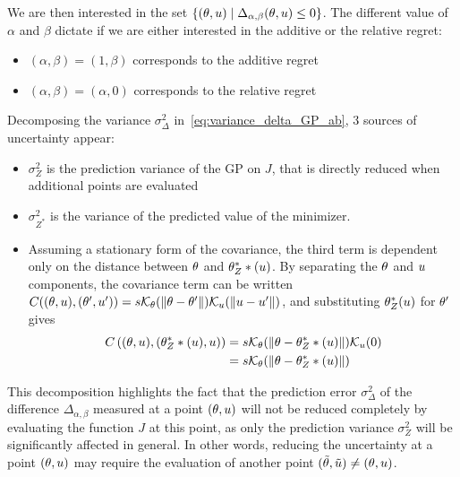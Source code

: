\documentclass[../../Main_ManuscritThese.tex]{subfiles}
\begin{document}
We are then interested in the set $\{(\theta, u) \mid \Delta_{\alpha, \beta}(\theta, u) \leq 0\}$. The different value of $\alpha$ and $\beta$ dictate if we are either interested in the additive or the relative regret:
\begin{itemize}
\item $(\alpha, \beta) = (1, \beta)$ corresponds to the additive regret
\item $(\alpha, \beta) = (\alpha, 0)$ corresponds to the relative regret
\end{itemize}



Decomposing the variance $\sigma^2_{\Delta}$ in~\cref{eq:variance_delta_GP_ab}, 3 sources of uncertainty appear:
\begin{itemize}
\item $\sigma^2_{Z}$ is the prediction variance of the GP on $J$, that is directly reduced when additional points are evaluated
\item $\sigma^2_{Z^*}$ is the variance of the predicted value of the minimizer.
\item Assuming a stationary form of the covariance, the third term is dependent only on the distance between $\theta$ and $\theta^*_Z*(u)$. By separating the $\theta$ and $u$ components, the covariance term can be written $C((\theta,u), (\theta^{\prime},u^{\prime})) = s \mathcal{K}_{\theta}(\|\theta - \theta^{\prime}\|) \mathcal{K}_{u}(\|u - u^{\prime}\|)$, and
  substituting $\theta^*_Z(u)$ for $\theta^{\prime}$ gives
\begin{align}
  C\left((\theta,u),(\theta^*_Z*(u),u)\right) &= s  \mathcal{K}_{\theta}(\|\theta - \theta^*_Z*(u)\|) \mathcal{K}_{u}(0) \\
                                           &= s  \mathcal{K}_{\theta}(\|\theta - \theta^*_Z*(u)\|)
\end{align}
\end{itemize}
This decomposition highlights the fact that the prediction error $\sigma_{\Delta}^2$ of the difference $\Delta_{\alpha,\beta}$ measured at a point $(\theta, u)$ will not be reduced completely by evaluating the function $J$ at this point, as only the prediction variance $\sigma_Z^2$ will be significantly affected in general. In other words, reducing the uncertainty at a point $(\theta, u)$ may require the evaluation of another point $(\tilde{\theta},\tilde{u}) \neq (\theta, u)$.
\end{document}
